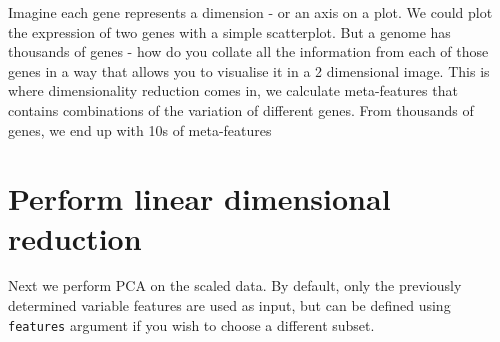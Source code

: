 \documentclass[
]{book}
\begin{document}
Imagine each gene represents a dimension - or an axis on a plot. We could plot the expression of two genes with a simple scatterplot. But a genome has thousands of genes - how do you collate all the information from each of those genes in a way that allows you to visualise it in a 2 dimensional image. This is where dimensionality reduction comes in, we calculate meta-features that contains combinations of the variation of different genes. From thousands of genes, we end up with 10s of meta-features

\hypertarget{section-6}{%
\subsubsection*{}\label{section-6}}

\hypertarget{perform-linear-dimensional-reduction}{%
\section{Perform linear dimensional reduction}\label{perform-linear-dimensional-reduction}}

Next we perform PCA on the scaled data. By default, only the previously determined variable features are used as input, but can be defined using \texttt{features} argument if you wish to choose a different subset.
\end{document}
